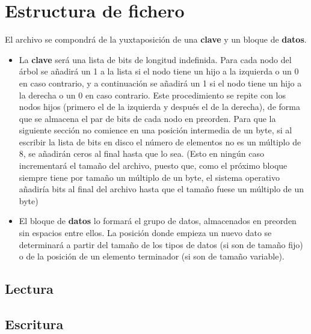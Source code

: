 \documentclass{article}
\begin{document}
\section{Estructura de fichero}

El archivo se compondrá de la yuxtaposición de una \textbf{clave} y un bloque de \textbf{datos}.

\begin{itemize}
	\item La \textbf{clave} será una lista de bits de longitud indefinida. Para cada nodo del árbol se añadirá un 1 a la lista si el nodo tiene un hijo a la izquierda o un 0 en caso contrario, y a continuación se añadirá un 1 si el nodo tiene un hijo a la derecha o un 0 en caso contrario. Este procedimiento se repite con los nodos hijos (primero el de la izquierda y después el de la derecha), de forma que se almacena el par de bits de cada nodo en preorden. Para que la siguiente sección no comience en una posición intermedia de un byte, si al escribir la lista de bits en disco el número de elementos no es un múltiplo de 8, se añadirán ceros al final hasta que lo sea. (Esto en ningún caso incrementará el tamaño del archivo, puesto que, como el próximo bloque siempre tiene por tamaño un múltiplo de un byte, el sistema operativo añadiría bits al final del archivo hasta que el tamaño fuese un múltiplo de un byte)
	\item El bloque de \textbf{datos} lo formará el grupo de datos, almacenados en preorden sin espacios entre ellos. La posición donde empieza un nuevo dato se determinará a partir del tamaño de los tipos de datos (si son de tamaño fijo) o de la posición de un elemento terminador (si son de tamaño variable).
\end{itemize}

\subsection{Lectura}

\subsection{Escritura}
\end{document}
